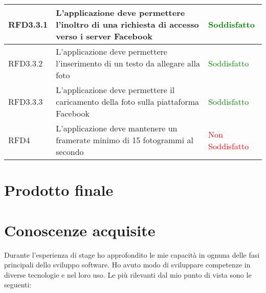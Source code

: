 \begin{center}
\begin{longtable}{ | p{2cm} | p{7cm} | p{2cm} |}
    RFD3.3.1 &  L'applicazione deve permettere l'inoltro di una richiesta di accesso verso i server Facebook & \textcolor{green}{Soddisfatto} \\ \hline
    RFD3.3.2 &  L'applicazione deve permettere l'inserimento di un testo da allegare alla foto & \textcolor{green}{Soddisfatto} \\ \hline
    RFD3.3.3 &  L'applicazione deve permettere il caricamento della foto sulla piattaforma Facebook & \textcolor{green}{Soddisfatto} \\ \hline
    RFD4 &  L'applicazione deve mantenere un framerate minimo di 15 fotogrammi al secondo & \textcolor{red}{Non Soddisfatto} \\ \hline
    \end{longtable}
\end{center}


\newpage
\section{Prodotto finale}



\section{Conoscenze acquisite}

Durante l'esperienza di stage ho approfondito le mie capacità in ognuna delle fasi principali
dello sviluppo software. Ho avuto modo di sviluppare competenze in diverse tecnologie e nel loro uso. Le più rilevanti dal mio punto di vista sono le seguenti:

